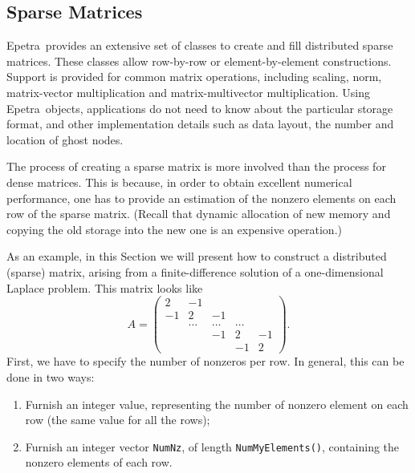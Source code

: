\documentclass[10pt,relax]{SANDreport}
\newcommand{\epetra}{{Epetra}}
\begin{document}
\subsection{Sparse Matrices}
\label{sec:matrices}

\epetra\ provides an extensive set of classes to create and fill
distributed sparse matrices. These classes allow row-by-row or
element-by-element constructions. Support is provided for common matrix
operations, including scaling, norm, matrix-vector multiplication and
matrix-multivector multiplication.
Using \epetra\ objects, applications do not need to know about the
particular storage format, and other implementation details such as data
layout, the number and location of ghost nodes. 

The process of creating a sparse matrix is more involved than the
process for dense matrices. This is because, in order to obtain
excellent numerical performance, one has to provide an estimation of
the nonzero elements on each row of the sparse matrix. (Recall that
dynamic allocation of new memory and copying the old storage into the
new one is an expensive operation.)

As an example, in this Section we will present how to construct a
distributed (sparse) matrix, arising from a finite-difference solution
of a one-dimensional Laplace problem. This matrix looks like
\begin{equation*}
A = \begin{pmatrix}
 2 & -1 &     &   &    \\
-1 &  2     & -1     &        &    \\
   & \ldots & \ldots & \ldots &  \\
   &        & -1     & 2      & -1 \\
   &        &        & -1     & 2
\end{pmatrix}.
\end{equation*}
First, we have to specify the number
of nonzeros per row. In general, this can be done in two ways:
\begin{enumerate}
\item Furnish an integer value, representing the number of nonzero
  element on each row (the same value for all the rows);
\item Furnish an integer vector \verb!NumNz!, of length
  \verb!NumMyElements()!, containing the nonzero elements of each row.
\end{enumerate}
\end{document}
